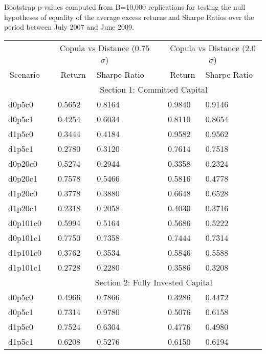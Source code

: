 \documentclass[a4paper]{article}
\begin{document}
\begin{threeparttable}[H]
	\centering \scriptsize
	\caption{Bootstrap p-values computed from B=10,000 replications for testing the null hypotheses of equality of the average excess returns and Sharpe Ratios over the period between July 2007 and June 2009.}
	\begin{tabularx}{\textwidth}{@{\extracolsep{\fill}}lllllll@{}}
		\toprule
		& & \multicolumn{2}{c}{Copula vs Distance (0.75$\sigma$)} & \multicolumn{1}{c}{} & \multicolumn{2}{c}{Copula vs Distance (2.0$\sigma$)} \\
		\cmidrule{3-4}  \cmidrule{6-7}
		\multicolumn{1}{c}{Scenario} & & \multicolumn{1}{c}{Return} & Sharpe Ratio &       & \multicolumn{1}{c}{Return}& Sharpe Ratio \\
		\midrule
		& \multicolumn{6}{c}{Section 1: Committed Capital} \\
		\midrule
		d0p5c0 & & 0.5652 & 0.8164 &       & 0.9840 & 0.9146 \\
		d0p5c1 & & 0.4254 & 0.6034 &       & 0.8110 & 0.8654 \\
		d1p5c0 & & 0.3444 & 0.4184 &       & 0.9582 & 0.9562 \\
		d1p5c1 & & 0.2780 & 0.3120 &       & 0.7614 & 0.7518 \\
		d0p20c0 & & 0.5274 & 0.2944 &       & 0.3358 & 0.2324 \\
		d0p20c1 & & 0.7578 & 0.5466 &       & 0.5816 & 0.4778 \\
		d1p20c0 & & 0.3778 & 0.3880 &       & 0.6648 & 0.6528 \\
		d1p20c1 & & 0.2318 & 0.2058 &       & 0.4030 & 0.3716 \\
		d0p101c0 & & 0.5994 & 0.5164 &       & 0.5686 & 0.5222 \\
		d0p101c1 & & 0.7750 & 0.7358 &       & 0.7444 & 0.7314 \\
		d1p101c0 & & 0.3762 & 0.3534 &       & 0.5846 & 0.5588 \\
		d1p101c1 & & 0.2728 & 0.2280 &       & 0.3586 & 0.3208 \\
		\midrule
		& \multicolumn{6}{c}{Section 2:  Fully Invested Capital } \\
		\midrule
		d0p5c0 & & 0.4966 & 0.7866 &       & 0.3286 & 0.4472 \\
		d0p5c1 & & 0.7314 & 0.9780 &       & 0.5076 & 0.6158 \\
		d1p5c0 & & 0.7524 & 0.6304 &       & 0.4776 & 0.4980 \\
		d1p5c1 & & 0.6208 & 0.5276 &       & 0.6150 & 0.6194 \\

\end{tabularx}
\end{threeparttable}
\end{document}
